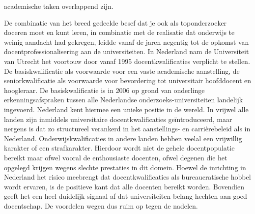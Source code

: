 \documentclass[empirical, authordate, ]{new-jote-article}
\begin{document}
academische taken overlappend zijn.



	De combinatie van het breed gedeelde besef dat je ook als toponderzoeker doceren moet en kunt leren, in combinatie met de realisatie dat onderwijs te weinig aandacht had gekregen, leidde vanaf de jaren negentig tot de opkomst van docentprofessionalisering aan de universiteiten. In Nederland nam de Universiteit van Utrecht het voortouw door vanaf 1995 docentkwalificaties verplicht te stellen. De basiskwalificatie als voorwaarde voor een vaste academische aanstelling, de seniorkwalificatie als voorwaarde voor bevordering tot universitair hoofddocent en hoogleraar. De basiskwalificatie is in 2006 op grond van onderlinge erkenningsafspraken tussen alle Nederlandse onderzoeks-universiteiten landelijk ingevoerd. Nederland kent hiermee een unieke positie in de wereld. In vrijwel alle landen zijn inmiddels universitaire docentkwalificaties geïntroduceerd, maar nergens is dat zo structureel verankerd in het aanstellings- en carrièrebeleid als in Nederland. Onderwijskwalificaties in andere landen hebben veelal een vrijwillig karakter of een strafkarakter. Hierdoor wordt niet de gehele docentpopulatie bereikt maar ofwel vooral de enthousiaste docenten, ofwel degenen die het opgelegd krijgen wegens slechte prestaties in dit domein. Hoewel de inrichting in Nederland het risico meebrengt dat docentkwalificaties als bureaucratische hobbel wordt ervaren, is de positieve kant dat alle docenten bereikt worden. Bovendien geeft het een heel duidelijk signaal af dat universiteiten belang hechten aan goed docentschap. De voordelen wegen dus ruim op tegen de nadelen.
\end{document}
